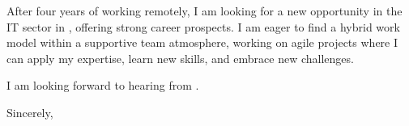 \documentclass[10pt, a4paper]{article}
\begin{document}
After four years of working remotely, I am looking for a new opportunity in the IT sector in \CITY, offering strong career prospects. I am eager to find a hybrid work model within a supportive team atmosphere, working on agile projects where I can apply my expertise, learn new skills, and embrace new challenges.

I am looking forward to hearing from \COMPANY. 

\bigskip

Sincerely,

\vspace{20pt}

\name
\end{document}
